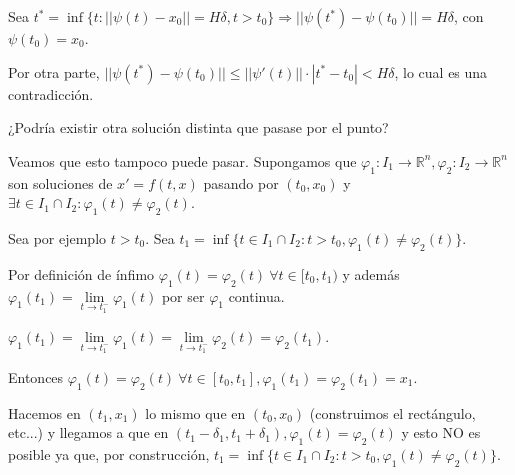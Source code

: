 \documentclass{article}
\makeatletter
\theoremstyle{theorem-style}  %
\theoremstyle{definition-style}
\theoremstyle{example-style}
\renewenvironment{proof}[1][\proofname]{\par
	\pushQED{\qed}%
	\normalfont \topsep6\p@\@plus6\p@\relax
	\list{}{%
		\settowidth{\leftmargin}{\quad:\hskip\labelsep}%
		\setlength{\labelwidth}{0pt}%
		\setlength{\itemindent}{-\leftmargin}%
	}%
	\item[\hskip\labelsep\itshape#1\@addpunct{:}]\ignorespaces
}{%
	\popQED\endlist\@endpefalse
}
\makeatother
\begin{document}
\begin{proof}
\begin{adjustwidth}{1cm}{}
		Sea $ t^* = \inf \{t : ||\psi(t)-x_0||=H\delta, t>t_0 \} \Rightarrow ||\psi(t^*)-\psi(t_0)||=H\delta$, con $ \psi(t_0)=x_0 $.
		
		Por otra parte, $ ||\psi(t^*)-\psi(t_0)||\leq ||\psi'(t)||\cdot |t^*-t_0|<H\delta $, lo cual es una contradicción.
	\end{adjustwidth}
	
	¿Podría existir otra solución distinta que pasase por el punto?
	\begin{adjustwidth}{1cm}{}
		Veamos que esto tampoco puede pasar. Supongamos que $ \varphi_1: I_1\longrightarrow\mathbb{R}^n, \varphi_2:I_2 \longrightarrow \mathbb{R}^n $ son soluciones de $ x'=f(t,x) $ pasando por $ (t_0,x_0) $ y $ \exists t\in I_1\cap I_2 : \varphi_1(t)\neq \varphi_2(t) $.
		
		Sea por ejemplo $ t>t_0 $. Sea $ t_1=\inf \{t \in I_1\cap I_2 :t>t_0, \varphi_1(t)\neq \varphi_2(t)  \} $.
		
		Por definición de ínfimo $ \varphi_1(t)=\varphi_2(t) \ \forall t \in [t_0, t_1) $ y además $ \varphi_1(t_1)=\lim\limits_{t\to t_1^-} \varphi_1(t) $ por ser $ \varphi_1 $ continua.
		
		$ \varphi_1(t_1)=\lim\limits_{t\to t_1^-} \varphi_1(t)=\lim\limits_{t\to t_1^-} \varphi_2(t)= \varphi_2(t_1) $.
		
		Entonces $ \varphi_1(t)=\varphi_2(t) \ \forall t \in [t_0,t_1], \varphi_1(t_1)=\varphi_2(t_1)=x_1 $.
		
		Hacemos en $ (t_1, x_1) $ lo mismo que en $ (t_0,x_0) $ (construimos el rectángulo, etc...) y llegamos a que en $ (t_1-\delta_1, t_1+\delta _1), \varphi_1(t)=\varphi_2(t) $ y esto NO es posible ya que, por construcción, $ t_1=\inf \{t\in I_1\cap I_2 : t>t_0, \varphi_1(t)\neq \varphi_2(t)\} $.
	\end{adjustwidth}
\end{proof}
\pagebreak
\end{document}

